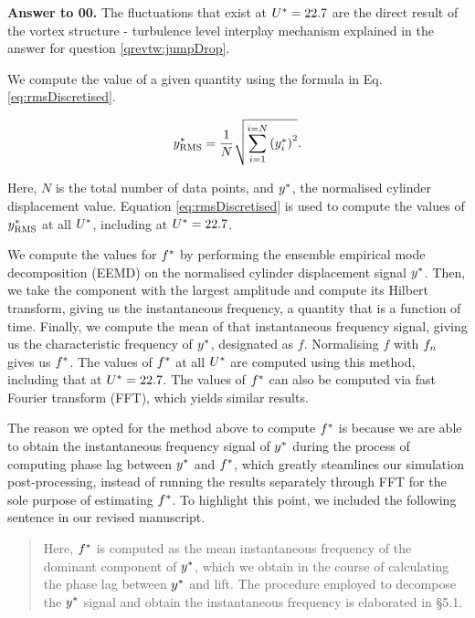 \documentclass[12pt]{article}
\newcounter{question}
\newcommand{\name}{00}
\newcommand{\answer}[1]{\noindent \textbf{Answer to \name.\thequestion}\vskip 0.25cm \noindent #1 \mbox{}\\}
\begin{document}
\answer{
  \hspace*{-0.3cm} The fluctuations that exist at $U^{*} = 22.7$ are the direct result of the vortex structure - turbulence level interplay mechanism explained in the answer for question \ref{qrevtw:jumpDrop}.

  We compute the \rms{} value of a given quantity using the formula in Eq. \ref{eq:rmsDiscretised}.

  \begin{equation}
    y^{*}_{\text{RMS}} = \frac{1}{N} \sqrt{\sum_{i = 1}^{i = N} \left( y^{*}_{i} \right) ^{2}}.
    \label{eq:rmsDiscretised}
  \end{equation}

  \noindent Here, $N$ is the total number of data points, and $y^{*}$, the normalised cylinder displacement value. Equation \ref{eq:rmsDiscretised} is used to compute the values of $y^{*}_{\text{RMS}}$ at all $U^{*}$, including at $U^{*} = 22.7$.

  We compute the values for $f^{*}$ by performing the ensemble empirical mode decomposition (EEMD) on the normalised cylinder displacement signal $y^{*}$. Then, we take the component with the largest \rms{} amplitude and compute its Hilbert transform, giving us the instantaneous frequency, a quantity that is a function of time. Finally, we compute the mean of that instantaneous frequency signal, giving us the characteristic frequency of $y^{*}$, designated as $f$. Normalising $f$ with $f_{n}$ gives us $f^{*}$. The values of $f^{*}$ at all $U^{*}$ are computed using this method, including that at $U^{*} = 22.7$. The values of $f^{*}$ can also be computed via fast Fourier transform (FFT), which yields similar results.

  The reason we opted for the method above to compute $f^{*}$ is because we are able to obtain the instantaneous frequency signal of $y^{*}$ during the process of computing phase lag between $y^{*}$ and $f^{*}$, which greatly steamlines our simulation post-processing, instead of running the results separately through FFT for the sole purpose of estimating $f^{*}$. To highlight this point, we included the following sentence in our revised manuscript.
  
  \begin{quotation}
    \color{blue}
    \noindent Here, $f^{*}$ is computed as the mean instantaneous frequency of the dominant component of $y^{*}$, which we obtain in the course of calculating the phase lag between $y^{*}$ and lift. The procedure employed to decompose the $y^{*}$ signal and obtain the instantaneous frequency is elaborated in \S5.1.
    \color{black}
  \end{quotation}
}
\end{document}
